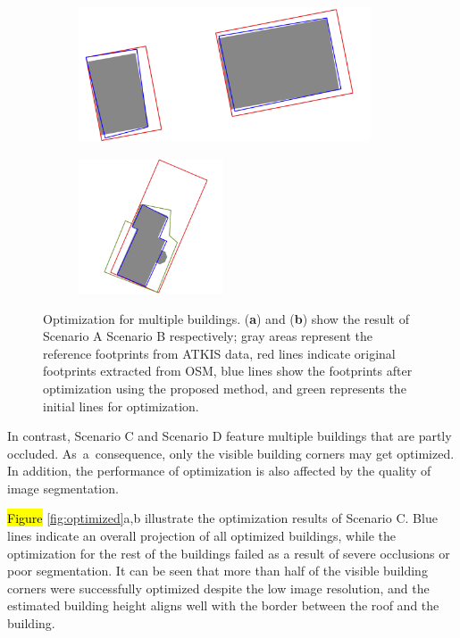 \documentclass[remotesensing,article,accept,moreauthors,pdftex,10pt,a4paper]{mdpi}
\theoremstyle{mdpi}
\newcounter{ex}
\newcounter{re}
\begin{document}
\begin{figure}[H]
    \centering
\begin{subfigure}[tbp]{0.47\columnwidth}
           \centering
           \includegraphics[height=4cm]{optimize/finning_overlay.png}
           \caption[]{}
           {{\small }}
           \label{fig:6a}
       \end{subfigure}
       \begin{subfigure}[tbp]{0.47\columnwidth}
           \centering
           \includegraphics[height=4cm]{optimize/kiga_overlay.png}
           \caption[]{}%
           {{\small }}
           \label{fig:6b}
       \end{subfigure}
       \caption{Optimization for multiple buildings. (\textbf{a}) and (\textbf{b}) show the result of Scenario A Scenario B respectively; gray areas represent the reference footprints from ATKIS 
data, red lines indicate original footprints extracted from OSM, blue lines show the footprints after optimization using the proposed method, and green represents the initial lines for optimization.}
       \label{fig:overlay}
\end{figure}

In contrast, Scenario C and Scenario D feature multiple buildings that are partly occluded. \mbox{As a consequence}, only the visible building corners may get optimized. In addition, the performance of optimization is also affected by the quality of image segmentation. 

\hl{Figure} \ref{fig:optimized}a,b illustrate the optimization results of Scenario C. Blue lines indicate an overall projection of all optimized buildings, while the optimization for the rest of the buildings failed as a result of severe occlusions or poor segmentation. It can be seen that more than half of the visible building corners were successfully optimized despite the low image resolution, and the estimated building height aligns well with the border between the roof and the building.
\end{document}
